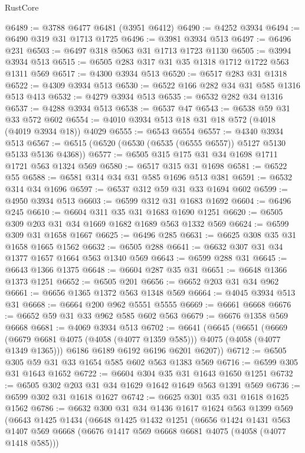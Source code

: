 \begin{lexlean}{RustCore}
\begin{coremodule}
@6489 := @3788 @6477 @6481 (@3951 @6412)
@6490 := @4252 @3934
@6494 := @6490 @319 @31 @1713 @1725
@6496 := @3981 @3934 @513
@6497 := @6496 @231
@6503 := @6497 @318 @5063 @31 @1713 @1723 @1130
@6505 := @3994 @3934 @513
@6515 := @6505 @283 @317 @31 @35 @1318 @1712 @1722 @563 @1311 @569
@6517 := @4300 @3934 @513
@6520 := @6517 @283 @31 @1318
@6522 := @4309 @3934 @513
@6530 := @6522 @166 @282 @34 @31 @585 @1316 @513 @413
@6532 := @4279 @3934 @513
@6535 := @6532 @282 @34 @1316
@6537 := @4288 @3934 @513
@6538 := @6537 @47
@6543 := @6538 @59 @31 @33 @572 @602
@6554 := @4010 @3934 @513 @18 @31 @18 @572 (@4018 (@4019 @3934 @18)) @4029
@6555 := @6543 @6554
@6557 := @4340 @3934 @513
@6567 := @6515 (@6520 (@6530 (@6535 (@6555 @6557)) @5127 @5130 @5133 @5136 @4368))
@6577 := @6505 @315 @175 @31 @34 @1698 @1711 @1721 @563 @1324 @569
@6580 := @6517 @315 @31 @1698
@6581 := @6522 @55
@6588 := @6581 @314 @34 @31 @585 @1696 @513 @381
@6591 := @6532 @314 @34 @1696
@6597 := @6537 @312 @59 @31 @33 @1694 @602
@6599 := @4950 @3934 @513
@6603 := @6599 @312 @31 @1683 @1692
@6604 := @6496 @245
@6610 := @6604 @311 @35 @31 @1683 @1690 @1251
@6620 := @6505 @309 @203 @31 @34 @1669 @1682 @1689 @563 @1332 @569
@6624 := @6599 @309 @31 @1658 @1667
@6625 := @6496 @285
@6631 := @6625 @308 @35 @31 @1658 @1665 @1562
@6632 := @6505 @288
@6641 := @6632 @307 @31 @34 @1377 @1657 @1664 @563 @1340 @569
@6643 := @6599 @288 @31
@6645 := @6643 @1366 @1375
@6648 := @6604 @287 @35 @31
@6651 := @6648 @1366 @1373 @1251
@6652 := @6505 @201
@6656 := @6652 @203 @31 @34 @962
@6661 := @6656 @1365 @1372 @563 @1348 @569
@6664 := @4045 @3934 @513 @31
@6668 := @6664 @200 @962 @5551 @5555
@6669 := @6661 @6668
@6676 := @6652 @59 @31 @33 @962 @585 @602 @563
@6679 := @6676 @1358 @569 @6668
@6681 := @4069 @3934 @513
@6702 := @6641
    (@6645
      (@6651
        (@6669 (@6679 @6681 @4075 (@4058 (@4077 @1359 @585))) @4075 (@4058 (@4077 @1349 @1365)))
        @6186
        @6189
        @6192
        @6196
        @6201
        @6207))
@6712 := @6505 @305 @59 @31 @33 @1654 @585 @602 @563 @1383 @569
@6716 := @6599 @305 @31 @1643 @1652
@6722 := @6604 @304 @35 @31 @1643 @1650 @1251
@6732 := @6505 @302 @203 @31 @34 @1629 @1642 @1649 @563 @1391 @569
@6736 := @6599 @302 @31 @1618 @1627
@6742 := @6625 @301 @35 @31 @1618 @1625 @1562
@6786 := @6632
    @300
    @31
    @34
    @1436
    @1617
    @1624
    @563
    @1399
    @569
    (@6643
      @1425
      @1434
      (@6648
        @1425
        @1432
        @1251
        (@6656
          @1424
          @1431
          @563
          @1407
          @569
          @6668
          (@6676 @1417 @569 @6668 @6681 @4075 (@4058 (@4077 @1418 @585)))

\end{coremodule}
\end{lexlean}
